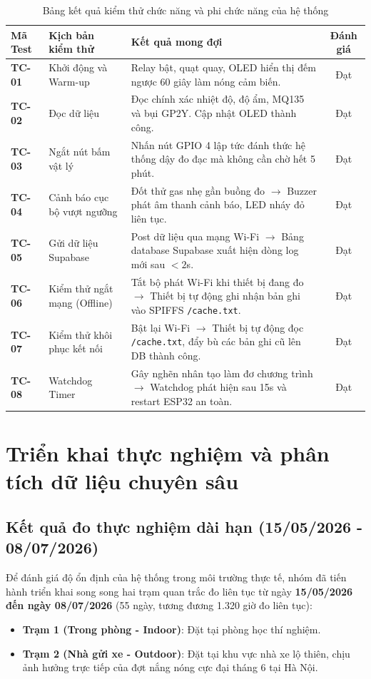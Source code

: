 \begin{table}[H]
\centering
\caption{Bảng kết quả kiểm thử chức năng và phi chức năng của hệ thống}
\label{tab:testcases}
\begin{small}
\begin{tabular}{lp{5.5cm}p{6.0cm}c}
\toprule
\textbf{Mã Test} & \textbf{Kịch bản kiểm thử} & \textbf{Kết quả mong đợi} & \textbf{Đánh giá} \\
\midrule
\textbf{TC-01} & Khởi động và Warm-up & Relay bật, quạt quay, OLED hiển thị đếm ngược 60 giây làm nóng cảm biến. & Đạt \\
\midrule
\textbf{TC-02} & Đọc dữ liệu & Đọc chính xác nhiệt độ, độ ẩm, MQ135 và bụi GP2Y. Cập nhật OLED thành công. & Đạt \\
\midrule
\textbf{TC-03} & Ngắt nút bấm vật lý & Nhấn nút GPIO 4 lập tức đánh thức hệ thống dậy đo đạc mà không cần chờ hết 5 phút. & Đạt \\
\midrule
\textbf{TC-04} & Cảnh báo cục bộ vượt ngưỡng & Đốt thử gas nhẹ gần buồng đo $\rightarrow$ Buzzer phát âm thanh cảnh báo, LED nháy đỏ liên tục. & Đạt \\
\midrule
\textbf{TC-05} & Gửi dữ liệu Supabase & Post dữ liệu qua mạng Wi-Fi $\rightarrow$ Bảng database Supabase xuất hiện dòng log mới sau $< 2$s. & Đạt \\
\midrule
\textbf{TC-06} & Kiểm thử ngắt mạng (Offline) & Tắt bộ phát Wi-Fi khi thiết bị đang đo $\rightarrow$ Thiết bị tự động ghi nhận bản ghi vào SPIFFS \texttt{/cache.txt}. & Đạt \\
\midrule
\textbf{TC-07} & Kiểm thử khôi phục kết nối & Bật lại Wi-Fi $\rightarrow$ Thiết bị tự động đọc \texttt{/cache.txt}, đẩy bù các bản ghi cũ lên DB thành công. & Đạt \\
\midrule
\textbf{TC-08} & Watchdog Timer & Gây nghẽn nhân tạo làm đơ chương trình $\rightarrow$ Watchdog phát hiện sau 15s và restart ESP32 an toàn. & Đạt \\
\bottomrule
\end{tabular}
\end{small}
\end{table}

\section{Triển khai thực nghiệm và phân tích dữ liệu chuyên sâu}
\subsection{Kết quả đo thực nghiệm dài hạn (15/05/2026 - 08/07/2026)}
Để đánh giá độ ổn định của hệ thống trong môi trường thực tế, nhóm đã tiến hành triển khai song song hai trạm quan trắc đo liên tục từ ngày \textbf{15/05/2026 đến ngày 08/07/2026} (55 ngày, tương đương 1.320 giờ đo liên tục):
\begin{itemize}
    \item \textbf{Trạm 1 (Trong phòng - Indoor)}: Đặt tại phòng học thí nghiệm.
    \item \textbf{Trạm 2 (Nhà gửi xe - Outdoor)}: Đặt tại khu vực nhà xe lộ thiên, chịu ảnh hưởng trực tiếp của đợt nắng nóng cực đại tháng 6 tại Hà Nội.
\end{itemize}

